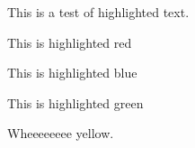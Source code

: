 \documentclass[letterpaper,portrait,12pt]{article}
\begin{document}
\setlength{\oddsidemargin}{0.7874in-1in}
\setlength{\textwidth}{\paperwidth - 0.7874in-0.7874in}

\begin{flushleft}
This is a test of highlighted text.
\end{flushleft}


\begin{flushleft}

\end{flushleft}


\begin{flushleft}
This is highlighted red
\end{flushleft}


\begin{flushleft}

\end{flushleft}


\begin{flushleft}
This is highlighted blue
\end{flushleft}


\begin{flushleft}

\end{flushleft}


\begin{flushleft}
This is highlighted green
\end{flushleft}


\begin{flushleft}

\end{flushleft}


\begin{flushleft}
Wheeeeeeee yellow.
\end{flushleft}
\end{document}
